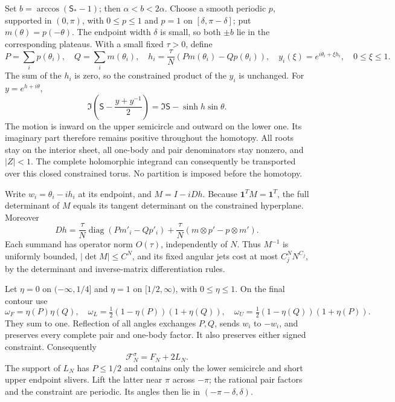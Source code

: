 \documentclass[11pt]{article}
\numberwithin{equation}{section}
\theoremstyle{definition}
\begin{document}
Set $b=\arccos(\mathsf S_*-1)$; then $\alpha<b<2\alpha$.
Choose a smooth periodic $p$, supported in $(0,\pi)$, with
$0\le p\le1$ and $p=1$ on $[\delta,\pi-\delta]$; put
$m(\theta)=p(-\theta)$.  The endpoint width $\delta$ is small,
so both $\pm b$ lie in the corresponding plateaus.  With a small
fixed $\tau>0$, define
\begin{equation}\label{eq:iso-balanced-deformation}
 P=\sum_i p(\theta_i),\quad Q=\sum_i m(\theta_i),\quad
 h_i=\frac\tau N(Pm(\theta_i)-Qp(\theta_i)),\quad
 y_i(\xi)=e^{i\theta_i+\xi h_i},\quad 0\le\xi\le1.
\end{equation}
The sum of the $h_i$ is zero, so the constrained product of the $y_i$
is unchanged.  For $y=e^{h+i\theta}$,
\[
 \Im\left(\mathsf S-\frac{y+y^{-1}}2\right)
       =\Im\mathsf S-\sinh h\sin\theta.
\]
The motion is inward on the upper semicircle and outward on the lower
one.  Its imaginary part therefore remains positive throughout the
homotopy.  All roots stay on the interior sheet, all one-body and pair
denominators stay nonzero, and $|Z|<1$.  The complete holomorphic
integrand can consequently be transported over this closed constrained
torus.  No partition is imposed before the homotopy.

Write $w_i=\theta_i-ih_i$ at its endpoint, and $M=I-iDh$.
Because $\boldsymbol1^TM=\boldsymbol1^T$, the full determinant of $M$
equals its tangent determinant on the constrained hyperplane.  Moreover
\[
 Dh=\frac\tau N\operatorname{diag}(Pm'_i-Qp'_i)
       +\frac\tau N(m\otimes p'-p\otimes m').
\]
Each summand has operator norm $O(\tau)$, independently of $N$.
Thus $M^{-1}$ is uniformly bounded, $|\det M|\le C^N$, and its
fixed angular jets cost at most $C_j^NN^{C_j}$, by the determinant
and inverse-matrix differentiation rules.

Let $\eta=0$ on $(-\infty,1/4]$ and $\eta=1$ on $[1/2,\infty)$,
with $0\le\eta\le1$.  On the final contour use
\[
 \omega_F=\eta(P)\eta(Q),\quad
 \omega_L=\tfrac12(1-\eta(P))(1+\eta(Q)),\quad
 \omega_U=\tfrac12(1-\eta(Q))(1+\eta(P)).
\]
They sum to one.  Reflection of all angles exchanges $P,Q$, sends
$w_i$ to $-w_i$, and preserves every complete pair and one-body factor.
It also preserves either signed constraint.  Consequently
\begin{equation}\label{eq:iso-exact-split}
 \mathcal F_N^\sigma=F_N+2L_N.
\end{equation}
The support of $L_N$ has $P\le1/2$ and contains only the lower
semicircle and short upper endpoint slivers.  Lift the latter near
$\pi$ across $-\pi$; the rational pair factors and the constraint are
periodic.  Its angles then lie in $(-\pi-\delta,\delta)$.
\end{document}
